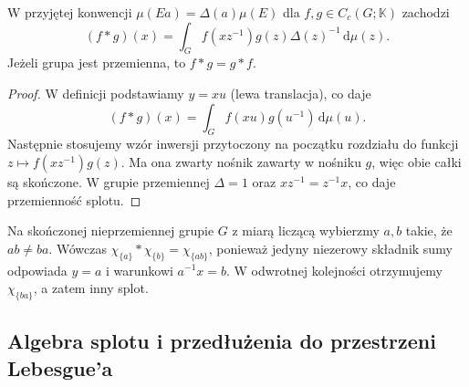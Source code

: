\begin{wniosek}
\label{cor:dt-haar-convolution-change}
W przyjętej konwencji $\mu(Ea)=\Delta(a)\mu(E)$
dla $f,g\in C_c(G;\mathbb K)$ zachodzi
\[
 (f*g)(x)=\int_G f(xz^{-1})g(z)\Delta(z)^{-1}
                  \,\mathrm d\mu(z).
\]
Jeżeli grupa jest przemienna, to $f*g=g*f$.
\end{wniosek}
\begin{proof}
W definicji podstawiamy $y=xu$ (lewa translacja),
co daje
\[
 (f*g)(x)=\int_G f(xu)g(u^{-1})\,\mathrm d\mu(u).
\]
Następnie stosujemy wzór inwersji przytoczony na początku rozdziału
do funkcji $z\mapsto f(xz^{-1})g(z)$. Ma ona zwarty nośnik
zawarty w nośniku $g$, więc obie całki są skończone.
W grupie przemiennej $\Delta=1$ oraz
$xz^{-1}=z^{-1}x$, co daje przemienność splotu.
\end{proof}

\begin{przyklad}
Na skończonej nieprzemiennej grupie $G$ z miarą
liczącą wybierzmy $a,b$ takie, że $ab\ne ba$.
Wówczas $\chi_{\{a\}}*\chi_{\{b\}}=\chi_{\{ab\}}$,
ponieważ jedyny niezerowy składnik sumy odpowiada
$y=a$ i warunkowi $a^{-1}x=b$.
W odwrotnej kolejności otrzymujemy
$\chi_{\{ba\}}$, a zatem inny splot.
\end{przyklad}

\subsection{Algebra splotu i przedłużenia do przestrzeni Lebesgue'a}

